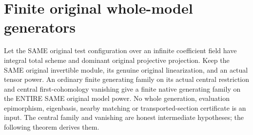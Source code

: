 \section{Finite original whole-model generators}
\begin{theorem}
\label{thm:central-embedding-original-finite-samepower-whole-generators}
\leanok
Let the SAME original test configuration over an infinite coefficient field
have integral total scheme and dominant original projective projection.
Keep the SAME original invertible module, its genuine original linearization,
and an actual tensor power. An ordinary finite generating family on its
actual central restriction and central first-cohomology vanishing give a
finite native generating family on the ENTIRE SAME original model power.
No whole generation, evaluation epimorphism, eigenbasis, nearby matching or
transported-section certificate is an input. The central family and vanishing
are honest intermediate hypotheses; the following theorem derives them.
\end{theorem}
